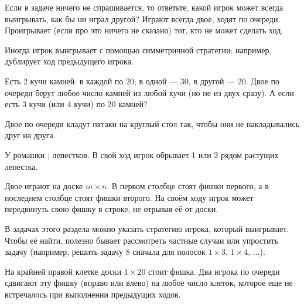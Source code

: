 \documentclass[a4paper,11pt]{article}
\begin{document}

{\small {\noindent} Если %
в задаче ничего не спрашивается, то
ответьте, какой игрок может всегда выигрывать,
как бы ни играл другой?
Играют всегда двое, ходят по очереди.
Проигрывает (если про это ничего не сказано) тот, кто не может
сделать ход.
}


\vspace*{-1truemm}

{\small Иногда игрок выигрывает с помощью
 симметричной стратегии: например, дублирует ход предыдущего
игрока.}

\vspace*{1truemm}

Есть 2 кучи камней:
\!\!  \!\! в каждой по 20;
\!\!  \!\! в одной --- 30, в другой --- 20.
Двое по очереди берут любое число камней из
любой кучи (но не из двух сразу). %
 А если есть 3 кучи (или 4 кучи) по 20 камней?

Двое по очереди кладут пятаки на круглый
стол так, чтобы они не накладывались друг на друга.


У ромашки \!\!\!  \!\!; \!\!  \! лепестков. В свой ход игрок
обрывает 1 или 2 рядом растущих лепестка.

Двое играют на доске $m\times n$. В первом
столбце стоят фишки первого, а в последнем столбце стоят фишки
второго. На своём ходу игрок может передвинуть свою фишку в
строке, не отрывая её от доски.


\vspace*{-1truemm}

{\small В задачах этого раздела можно указать стратегию
игрока, который выигрывает. Чтобы её найти, полезно бывает
рассмотреть частные случаи или упростить задачу (например, решить задачу
8 сначала для полосок $1\times3$, $1\times4$, $\dots$).
}

\vspace*{1truemm}

 На крайней правой клетке доски $1\times 20$ стоит фишка.
Два игрока по очереди сдвигают эту фишку (вправо или влево)
на любое число клеток, которое еще не встречалось при
выполнении предыдущих ходов.
\end{document}
